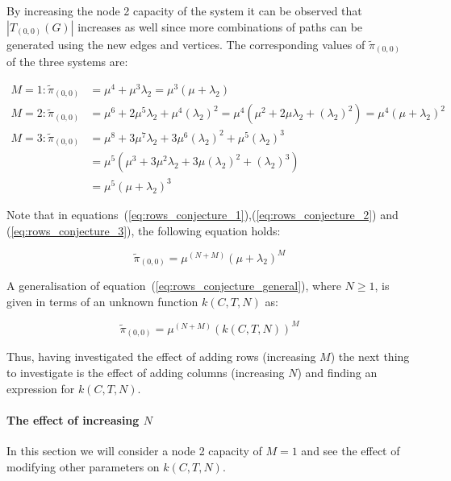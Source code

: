 By increasing the node 2 capacity of the system it can be observed that
\(|T_{(0,0)}(G)|\) increases as well since more combinations of paths can be
generated using the new edges and vertices.
The corresponding values of \(\tilde{\pi}_{(0,0)}\) of the three systems are:

\begin{align}
    M = 1: \tilde{\pi}_{(0,0)} &= \mu^4 + \mu^3 \lambda_2 =
    \mu^3 (\mu + \lambda_2) \label{eq:rows_conjecture_1}\\
    M = 2: \tilde{\pi}_{(0,0)} &= \mu^6 + 2\mu^5 \lambda_2 + \mu^4 (\lambda_2)^2
    = \mu^4(\mu^2 + 2\mu \lambda_2 + (\lambda_2)^2)
    = \mu^4 (\mu + \lambda_2) ^ 2 \label{eq:rows_conjecture_2}\\
    M = 3: \tilde{\pi}_{(0,0)} &= \mu^8 + 3 \mu^7 \lambda_2 +
    3 \mu^6 (\lambda_2)^2 + \mu^5(\lambda_2)^3 \nonumber \\
    &= \mu^5 (\mu^3 + 3 \mu ^2 \lambda_2 + 3 \mu (\lambda_2)^2 + (\lambda_2)^3)
    \nonumber \\
    &= \mu^5 (\mu + \lambda_2) ^ 3 \label{eq:rows_conjecture_3}
\end{align}

Note that in equations~(\ref{eq:rows_conjecture_1}),(\ref{eq:rows_conjecture_2})
and (\ref{eq:rows_conjecture_3}), the following equation holds:

\begin{equation}\label{eq:rows_conjecture_general}
    \tilde{\pi}_{(0,0)} = \mu^{(N+M)} (\mu + \lambda_2)^M
\end{equation}

A generalisation of equation~(\ref{eq:rows_conjecture_general}), where \(N \geq
1\), is given in terms of an unknown function \(k(C,T,N)\) as:

\begin{equation}
    \tilde{\pi}_{(0,0)} = \mu^{(N+M)} (k(C,T,N))^M
\end{equation}

Thus, having investigated the effect of adding rows (increasing \(M\)) the
next thing to investigate is the effect of adding columns (increasing \(N\))
and finding an expression for \(k(C,T,N)\).

\paragraph{The effect of increasing \(N\)}
In this section we will consider a node 2 capacity of \(M=1\) and see the
effect
of modifying other parameters on \(k(C, T, N)\).


